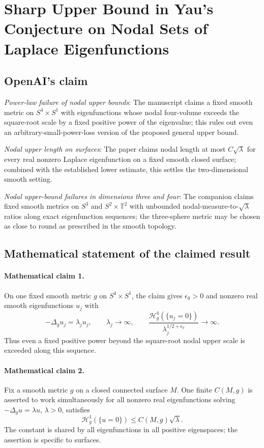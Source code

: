 \documentclass[11pt]{article}
\begin{document}
\section*{Sharp Upper Bound in Yau's Conjecture on Nodal Sets of Laplace Eigenfunctions}

\subsection{OpenAI's claim}
\textit{Power-law failure of nodal upper bounds}: The manuscript claims a fixed smooth metric on $S^4\times S^1$ with eigenfunctions whose nodal four-volume exceeds the square-root scale by a fixed positive power of the eigenvalue; this rules out even an arbitrary-small-power-loss version of the proposed general upper bound.

\textit{Nodal upper length on surfaces}: The paper claims nodal length at most $C\sqrt\lambda$ for every real nonzero Laplace eigenfunction on a fixed smooth closed surface; combined with the established lower estimate, this settles the two-dimensional smooth setting.

\textit{Nodal upper-bound failures in dimensions three and four}: The companion claims fixed smooth metrics on $S^3$ and $S^2\times\mathbb T^2$ with unbounded nodal-measure-to-$\sqrt\lambda$ ratios along exact eigenfunction sequences; the three-sphere metric may be chosen as close to round as prescribed in the smooth topology.

\subsection{Mathematical statement of the claimed result}
\paragraph{Mathematical claim 1.} On one fixed smooth metric $g$ on $S^4\times S^1$, the claim gives $\epsilon_0>0$ and nonzero real smooth eigenfunctions $u_j$ with \[-\Delta_gu_j=\lambda_ju_j,\qquad\lambda_j\to\infty,\qquad\frac{\mathcal H_g^4(\{u_j=0\})}{\lambda_j^{1/2+\epsilon_0}}\to\infty.\] Thus even a fixed positive power beyond the square-root nodal upper scale is exceeded along this sequence.

\paragraph{Mathematical claim 2.} Fix a smooth metric $g$ on a closed connected surface $M$. One finite $C(M,g)$ is asserted to work simultaneously for all nonzero real eigenfunctions solving $-\Delta_gu=\lambda u$, $\lambda>0$, satisfies \[\mathcal H_g^1(\{u=0\})\le C(M,g)\sqrt\lambda.\] The constant is shared by all eigenfunctions in all positive eigenspaces; the assertion is specific to surfaces.
\end{document}
